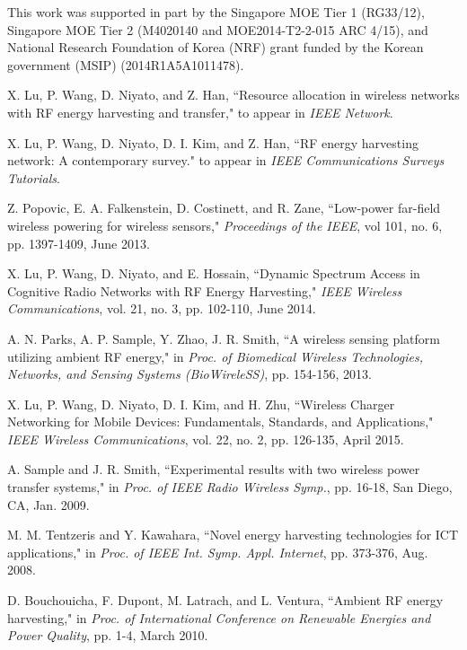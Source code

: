 \documentclass[12pt,draftclsnofoot,onecolumn]{IEEEtran}
\begin{document}
This work was supported in part by the Singapore MOE Tier 1  (RG33/12), Singapore MOE Tier 2 (M4020140 and MOE2014-T2-2-015 ARC 4/15), and National Research Foundation of Korea (NRF) grant funded by the Korean government (MSIP) (2014R1A5A1011478).   

 
\begin{thebibliography}{99}





X. Lu, P. Wang, D. Niyato, and Z. Han, ``Resource allocation in wireless networks with RF energy harvesting and transfer," to appear in \emph{IEEE Network}.

X. Lu, P. Wang, D. Niyato, D. I. Kim, and Z. Han, ``RF energy harvesting network: A contemporary survey." to appear in \emph{IEEE Communications Surveys  Tutorials}. 
 

Z. Popovic, E. A. Falkenstein, D. Costinett, and R. Zane, ``Low-power far-field wireless powering for wireless sensors," \emph{Proceedings of the IEEE}, vol 101, no. 6, pp. 1397-1409, June 2013.


X. Lu, P. Wang, D. Niyato, and E. Hossain, ``Dynamic Spectrum Access in Cognitive Radio Networks with RF Energy Harvesting," \emph{IEEE Wireless Communications}, vol. 21, no. 3, pp. 102-110, June 2014.



A. N. Parks, A. P. Sample, Y. Zhao, J. R. Smith, ``A wireless sensing platform utilizing ambient RF energy," in \emph{Proc. of Biomedical Wireless Technologies, Networks, and Sensing Systems (BioWireleSS)}, pp. 154-156, 2013.  

X. Lu, P. Wang, D. Niyato, D. I. Kim, and H. Zhu, ``Wireless Charger Networking for Mobile Devices: Fundamentals, Standards, and Applications,"  \emph{IEEE Wireless Communications}, vol. 22, no. 2, pp. 126-135, April 2015. 


A. Sample and J. R. Smith, ``Experimental results with two wireless power transfer systems," in \emph{Proc. of IEEE Radio Wireless Symp.}, pp. 16-18, San Diego, CA, Jan. 2009. 

M. M. Tentzeris and Y. Kawahara, ``Novel energy harvesting technologies for ICT applications," in \emph{Proc. of IEEE Int. Symp. Appl. Internet}, pp. 373-376, Aug. 2008.


D. Bouchouicha, F. Dupont, M. Latrach, and L. Ventura, ``Ambient RF energy harvesting," in \emph{Proc. of International Conference on Renewable Energies and Power Quality}, pp. 1-4, March 2010.


\end{thebibliography}
\end{document}
